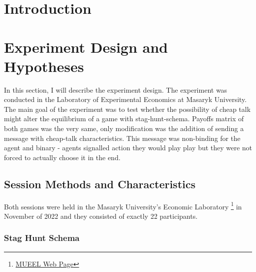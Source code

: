 \documentclass[
  digital, %
  twoside, %
  lof,     %
  lot,     %
]{fithesis4}
\begin{document}
\makeatletter
  \thesis@preamble %
\makeatother


\chapter*{Introduction}

\chapter{Experiment Design and Hypotheses}
In this section, I will describe the experiment design. The experiment was conducted in the Laboratory of Experimental Economics at Masaryk University. The main goal of the experiment was to test whether the possibility of cheap talk might alter the equilibrium of a game with stag-hunt-schema. Payoffs matrix of both games was the very same, only modification was the addition of sending a message with cheap-talk characteristics. This message was non-binding for the agent and binary - agents signalled action they would play play but they were not forced to actually choose it in the end. 

\section{Session Methods and Characteristics}
Both sessions were held in the Masaryk University's Economic Laboratory \footnote{\href{https://mueel.econ.muni.cz/}{MUEEL Web Page}} in November of 2022 and they consisted of exactly 22 participants. 

\subsection{Stag Hunt Schema}
\end{document}
